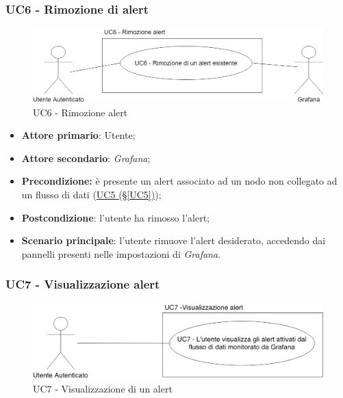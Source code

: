 \newpage

\subsubsection{UC6 - Rimozione di alert}\label{UC6}

\begin{figure}[H]
	\centering
	\includegraphics[scale=0.4]{./images/UC6.png}
	\caption{UC6 - Rimozione alert}
\end{figure}

\begin{itemize}
	\item \textbf{Attore primario}: Utente;
	\item \textbf{Attore secondario}: \textit{Grafana};
	\item \textbf{Precondizione:} è presente un alert associato ad un nodo non collegato ad un flusso di dati
	(\hyperref[UC5]{UC5 (§\ref*{UC5})});
	\item \textbf{Postcondizione}: l'utente ha rimosso l'alert;
	\item \textbf{Scenario principale}: l'utente rimuove l'alert desiderato, accedendo dai pannelli presenti nelle impostazioni di \textit{Grafana}.
\end{itemize}

\pagebreak

\subsubsection{UC7 - Visualizzazione alert}\label{UC7}

\begin{figure}[H]
	\centering
	\includegraphics[scale=0.4]{./images/UC7.png}
	\caption{UC7 - Visualizzazione di un alert}
\end{figure}

